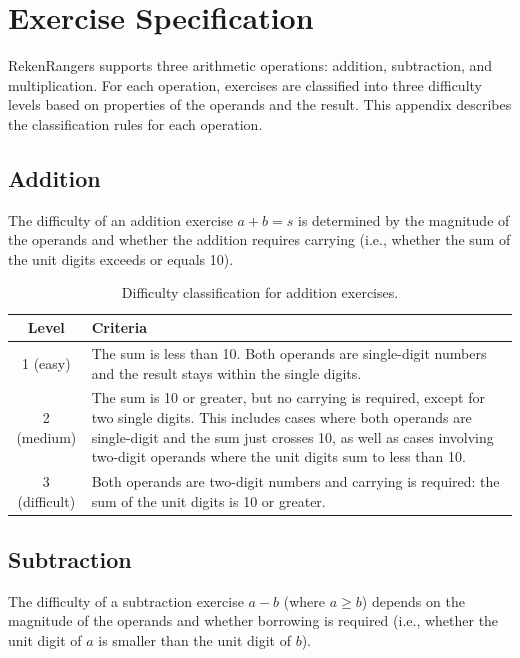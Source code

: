 
\chapter{Exercise Specification}
\label{app:exercise-spec}

RekenRangers supports three arithmetic operations: addition, subtraction, and multiplication. For each operation, exercises are classified into three difficulty levels based on properties of the operands and the result. This appendix describes the classification rules for each operation.

\section{Addition}

The difficulty of an addition exercise $a + b = s$ is determined by the magnitude of the operands and whether the addition requires carrying (i.e., whether the sum of the unit digits exceeds or equals 10).

\begin{table}[ht]
\centering
\begin{tabular}{cp{10cm}}
\toprule
Level & Criteria \\
\midrule
1 (easy) & The sum is less than 10. Both operands are single-digit numbers and the result stays within the single digits. \\
2 (medium) & The sum is 10 or greater, but no carrying is required, except for two single digits. This includes cases where both operands are single-digit and the sum just crosses 10, as well as cases involving two-digit operands where the unit digits sum to less than 10. \\
3 (difficult) & Both operands are two-digit numbers and carrying is required: the sum of the unit digits is 10 or greater. \\
\bottomrule
\end{tabular}
\caption{Difficulty classification for addition exercises.}
\label{tab:diff-addition}
\end{table}

\section{Subtraction}

The difficulty of a subtraction exercise $a - b$ (where $a \geq b$) depends on the magnitude of the operands and whether borrowing is required (i.e., whether the unit digit of $a$ is smaller than the unit digit of $b$).

